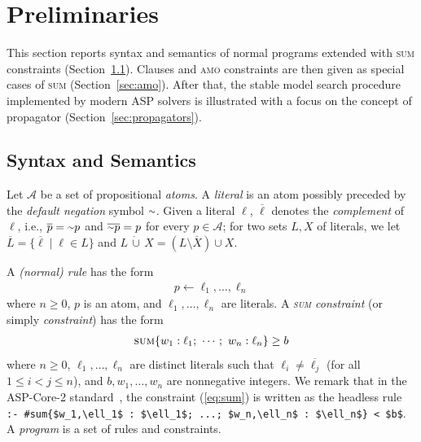 \documentclass[preprint,authoryear]{elsarticle}
\newcommand{\cupdot}{\,\dot{\cup}\,}
\def\naf{\ensuremath{\raise.17ex\hbox{\ensuremath{\scriptstyle\mathtt{\sim}}}}\xspace}
\theoremstyle{definition}
\def\naf{\ensuremath{\raise.17ex\hbox{\ensuremath{\scriptstyle\mathtt{\sim}}}}\xspace}
\begin{document}




\section{Preliminaries}
\label{sec:prel}
This section reports syntax and semantics of normal programs extended with \textsc{sum} constraints (Section~\ref{sec:syntax}).
Clauses and \textsc{amo} constraints are then given as special cases of \textsc{sum} (Section~\ref{sec:amo}).
After that, the stable model search procedure implemented by modern ASP solvers is illustrated with a focus on the concept of propagator (Section~\ref{sec:propagators}).

\subsection{Syntax and Semantics}\label{sec:syntax}
Let $\mathcal{A}$ be a set of propositional \emph{atoms}.
A \emph{literal} is an atom possibly preceded by the \emph{default negation} symbol \naf.
Given a literal $\ell$, $\overline{\ell}$ denotes the \emph{complement} of $\ell$, i.e., $\overline{p} = \naf p$ and $\overline{\naf p} = p$ for every $p \in \mathcal{A}$;
for two sets $L,X$ of literals, we let $\overline{L}=\{\overline{\ell} \mid \ell \in L\}$ and
$L \cupdot X = (L \setminus \overline{X}) \cup X$.

A \emph{(normal) rule} has the form
\begin{align}\label{eq:rule}
    p \leftarrow \ell_1, \ldots, \ell_n
\end{align}
where $n \geq 0$, $p$ is an atom, and $\ell_1,\ldots,\ell_n$ are literals.
A \emph{\textsc{sum} constraint} (or simply {\em constraint}) has the form
\begin{align}\label{eq:sum}
    \textsc{sum}\{w_1 : \ell_1;\ \cdots;\ w_n : \ell_n\} \geq b
\end{align}
where $n \geq 0$, $\ell_1,\ldots,\ell_n$ are distinct literals such that $\ell_i \neq \overline{\ell_j}$ (for all $1 \leq i < j \leq n$),
and $b,w_1,\ldots,w_n$ are nonnegative integers.
We remark  that in the ASP-Core-2 standard~\citep{DBLP:journals/tplp/CalimeriFGIKKLM20}, the constraint (\ref{eq:sum}) is written as the headless rule \linebreak \lstinline|:- #sum{$w_1,\ell_1$ : $\ell_1$; ...; $w_n,\ell_n$ : $\ell_n$} < $b$|. 
A \emph{program} is a set of rules and constraints.
\end{document}
